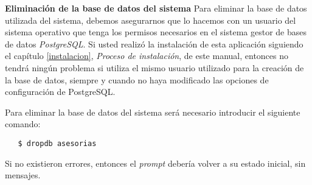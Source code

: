 \item \textbf{Eliminación de la base de datos del sistema}
  Para eliminar la base de datos utilizada del sistema, debemos asegurarnos que
  lo hacemos con un usuario del sistema operativo que tenga los permisos
  necesarios en el sistema gestor de bases de datos \textit{PostgreSQL}. Si
  usted realizó la instalación de esta aplicación siguiendo el capítulo
  \ref{instalacion}, \textit{Proceso de instalación}, de este manual, entonces
  no tendrá ningún problema si utiliza el mismo usuario utilizado para la
  creación de la base de datos, siempre y cuando no haya modificado las opciones
  de configuración de PostgreSQL.

  Para eliminar la base de datos del sistema será necesario introducir el
  siguiente comando:

   \begin{verbatim}
   $ dropdb asesorias
   \end{verbatim}

  Si no existieron errores, entonces el \textit{prompt} debería volver a su
  estado inicial, sin mensajes.